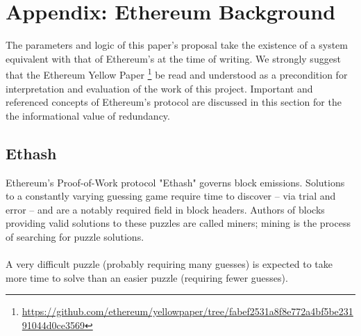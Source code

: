 \documentclass[11pt]{article}
\theoremstyle{plain}
\begin{document}






\pagebreak
\section{\normalsize{Appendix: Ethereum Background}}

The parameters and logic of this paper's proposal take the existence of a
system equivalent with that of Ethereum's at the time of writing.
We strongly suggest that the Ethereum Yellow Paper\nolinebreak
\footnote{\url{https://github.com/ethereum/yellowpaper/tree/fabef2531a8f8e772a4bf5be23191044d0ce3569}}
be read and understood as a precondition for interpretation and evaluation
of the work of this project.
Important and referenced concepts of Ethereum's protocol are discussed in this 
section for the the informational value of redundancy.

\subsection{\small{Ethash}}

Ethereum's Proof-of-Work protocol "Ethash" governs block emissions. Solutions
to a constantly varying guessing game require time to discover -- via trial and
error -- and are a notably required field in block headers. Authors of blocks
providing valid solutions to these puzzles are called miners; mining is the
process of searching for puzzle solutions. \\
\\
A very difficult puzzle (probably requiring many guesses) is expected to take 
more time to solve than an easier puzzle (requiring fewer guesses).
\end{document}
